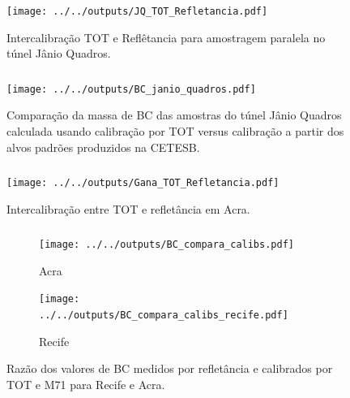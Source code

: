 \begin{frame}
  \frametitle{}
  \begin{figure}[H]
    \centering
    \texttt{[image: ../../outputs/JQ\_TOT\_Refletancia.pdf]}
    \caption{Intercalibração TOT e Reflêtancia para amostragem paralela no 
             túnel Jânio Quadros. \label{table:interJQ}}
  \end{figure}
\end{frame}


\begin{frame}
  \frametitle{}
  \begin{figure}[H]
    \centering
    \begin{minipage}[b]{0.5\linewidth}
      \texttt{[image: ../../outputs/BC\_janio\_quadros.pdf]}
      \caption{Comparação da massa de BC das amostras do túnel Jânio Quadros 
               calculada usando calibração por TOT versus calibração a partir dos 
               alvos padrões produzidos na CETESB. \label{fig:JQ}}
    \end{minipage}
    \hspace{0.5cm}
    \begin{minipage}[b]{0.45\linewidth}
      \begin{small}
        
      \end{small}
    \end{minipage}
  \end{figure}
\end{frame}


\begin{frame}
  \frametitle{}
  \begin{figure}[H]
  	\begin{center}
  		\texttt{[image: ../../outputs/Gana\_TOT\_Refletancia.pdf]}
  		\caption{Intercalibração entre TOT e refletância em Acra. \label{fig:interGanaBC}}
  	\end{center}
  \end{figure}
\end{frame}

\begin{frame}
  \frametitle{}
  \begin{figure}[H]
  	\centering
  	\begin{subfigure}[b]{0.43\linewidth}
  		\texttt{[image: ../../outputs/BC\_compara\_calibs.pdf]}
  		\caption{Acra \label{fig:razaoTOTM71}}
  	\end{subfigure}
  		\hspace{0.3cm}
  	\begin{subfigure}[b]{0.43\linewidth}
  		\texttt{[image: ../../outputs/BC\_compara\_calibs\_recife.pdf]}
  		\caption{Recife \label{fig:BC_compara_recife}}
  	\end{subfigure}%
  
  	\caption{Razão dos valores de BC medidos por refletância e calibrados por 
  		TOT e M71 para Recife e Acra. \label{fig:BC_compara}}
  \end{figure}
\end{frame}


